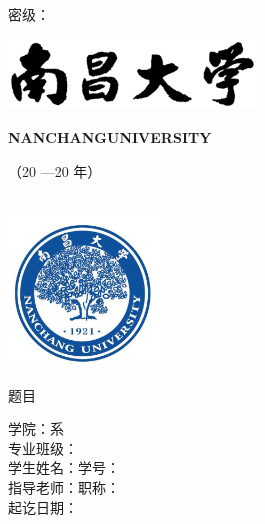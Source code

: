 \documentclass[a4paper,AutoFakeBold,oneside,12pt]{book}
\begin{document}
\begin{titlepage}

\thispagestyle{empty}
\begin{spacing}{1}
    \covercredentialfont \hfill 密级：\underline{}

    \centering\vspace{7pt}\includegraphics[height=1.88cm, width=6.59cm]{pictures/NCU}

    \textbf{NANCHANG\quad UNIVERSITY}


    \vspace{9pt}

    \vspace{7pt} \coveryearfont（20  —20  年）

    \quad\\
    \vspace{7pt}\includegraphics[height=4.02cm, width=4.02cm]{pictures/NCU_sign}

    \vfill
    \covertitlefont 题\hspace{1.5em}目\underline{}
\end{spacing}
\begin{spacing}{2.15}
    \coveritemsfont\vspace{22pt}
    \begin{center}
        学\qquad 院：\underline{}\nobreak 系\underline{}\\
        专业班级：\underline{}\\
        学生姓名：\underline{}\nobreak 学号：\underline{}\\
        指导老师：\underline{}\nobreak 职称：\underline{}\\
        起讫日期：\underline{\makebox[17em]{}}\\
    \end{center}
\end{spacing}


\end{titlepage}
\end{document}
